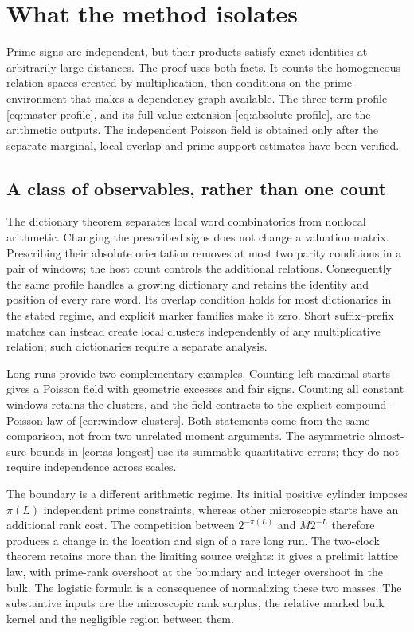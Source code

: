 \section{What the method isolates}\label{sec:discussion}
Prime signs are independent, but their products satisfy exact identities
at arbitrarily large distances. The proof uses both facts. It counts the
homogeneous relation spaces created by multiplication, then conditions on
the prime environment that makes a dependency graph available. The
three-term profile \eqref{eq:master-profile}, and its full-value extension
\eqref{eq:absolute-profile}, are the arithmetic outputs. The independent
Poisson field is obtained only after the separate marginal, local-overlap
and prime-support estimates have been verified.

\subsection{A class of observables, rather than one count}
The dictionary theorem separates local word combinatorics from nonlocal
arithmetic. Changing the prescribed signs does not change a valuation
matrix. Prescribing their absolute orientation removes at most two parity
conditions in a pair of windows; the host count controls the additional
relations. Consequently the same profile handles a growing dictionary and
retains the identity and position of every rare word. Its overlap condition
holds for most dictionaries in the stated regime, and explicit marker
families make it zero. Short suffix--prefix matches can instead create
local clusters independently of any multiplicative relation; such
dictionaries require a separate analysis.

Long runs provide two complementary examples. Counting left-maximal starts
gives a Poisson field with geometric excesses and fair signs. Counting all
constant windows retains the clusters, and the field contracts to the
explicit compound-Poisson law of \cref{cor:window-clusters}. Both statements
come from the same comparison, not from two unrelated moment arguments.
The asymmetric almost-sure bounds in \cref{cor:as-longest} use its summable
quantitative errors; they do not require independence across scales.

The boundary is a different arithmetic regime. Its initial positive
cylinder imposes $\pi(L)$ independent prime constraints, whereas other
microscopic starts have an additional rank cost. The competition between
$2^{-\pi(L)}$ and $M2^{-L}$ therefore produces a change in the location
and sign of a rare long run. The two-clock theorem retains more than the
limiting source weights: it gives a prelimit lattice law, with prime-rank
overshoot at the boundary and integer overshoot in the bulk. The logistic
formula is a consequence of normalizing these two masses. The substantive
inputs are the microscopic rank surplus, the relative marked bulk kernel
and the negligible region between them.


